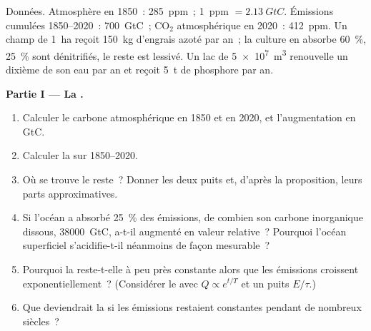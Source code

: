 \begin{problem}
\label{pb:b2:biogeochemical-cycles:1}
Données. Atmosphère en 1850~: \qty{285}{ppm}~; \qty{1}{ppm} $=
\qty{2.13}{GtC}$. Émissions cumulées 1850--2020~: \qty{700}{GtC}~;
$\mathrm{CO_2}$ atmosphérique en 2020~: \qty{412}{ppm}. Un champ de
\qty{1}{ha} reçoit \qty{150}{kg} d'engrais azoté par an~; la culture en
absorbe \qty{60}{\%}, \qty{25}{\%} sont dénitrifiés, le reste est
lessivé. Un lac de \qty{5e7}{m^3} renouvelle un dixième de son eau par an
et reçoit \qty{5}{t} de phosphore par an.

\medskip
\noindent\textbf{Partie I --- La .}
\begin{enumerate}
  \item Calculer le carbone atmosphérique en 1850 et en 2020, et
        l'augmentation en GtC.
  \item Calculer la  sur 1850--2020.
  \item Où se trouve le reste~? Donner les deux puits et, d'après la
        proposition, leurs parts approximatives.
  \item Si l'océan a absorbé \qty{25}{\%} des émissions, de combien son
        carbone inorganique dissous, \qty{38000}{GtC}, a-t-il augmenté en
        valeur relative~? Pourquoi l'océan superficiel s'acidifie-t-il
        néanmoins de façon mesurable~?
  \item Pourquoi la  reste-t-elle à peu près
        constante alors que les émissions croissent exponentiellement~?
        (Considérer le  avec
        $Q \propto e^{t/T}$ et un puits $E/\tau$.)
  \item Que deviendrait la  si les émissions
        restaient constantes pendant de nombreux siècles~?
\end{enumerate}


\end{problem}
